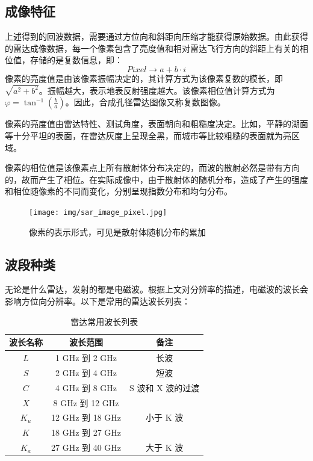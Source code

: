\documentclass{xduugthesis}
\begin{document}
\subsection{成像特征}
上述得到的回波数据，需要通过方位向和斜距向压缩才能获得原始数据。由此获得的雷达成像数据，每一个像素包含了亮度值和相对雷达飞行方向的斜距上有关的相位值，存储的是复数信息\cite{SAR_Pixel}，即：
$$Pixel\rightarrow a+b \cdot i$$
像素的亮度值是由该像素振幅决定的，其计算方式为该像素复数的模长，即$\sqrt{a^2+b^2}$。振幅越大，表示地表反射强度越大。该像素相位值计算方式为$\varphi = \tan^{-1}(\frac{b}{a})$。因此，合成孔径雷达图像又称复数图像。\par
像素的亮度值由雷达特性、测试角度，表面朝向和粗糙度决定。比如，平静的湖面等十分平坦的表面，在雷达灰度上呈现全黑，而城市等比较粗糙的表面就为亮区域。\par
像素的相位值是该像素点上所有散射体分布决定的，而波的散射必然是带有方向的，故而产生了相位。在实际成像中，由于散射体的随机分布，造成了产生的强度和相位随像素的不同而变化，分别呈现指数分布和均匀分布。
\begin{figure}[h!]
	\centering
	\texttt{[image: img/sar\_image\_pixel.jpg]}
	\caption{像素的表示形式，可见是散射体随机分布的累加}
\end{figure}

\subsection{波段种类}
无论是什么雷达，发射的都是电磁波。根据上文对分辨率的描述，电磁波的波长会影响方位向分辨率。以下是常用的雷达波长列表\cite{SAR_Radar_Wavelenngth}：
\begin{table}[h!]
	\begin{center}
		\caption{雷达常用波长列表}
		\begin{tabular}{|c|c|c|}
			\hline
			\textbf{波长名称} & \textbf{波长范围} & \textbf{备注}\\
			\hline
			$L$ & 1 GHz 到 2 GHz & 长波 \\
			\hline
			$S$ & 2 GHz 到 4 GHz & 短波 \\
			\hline
			$C$ & 4 GHz 到 8 GHz & S 波和 X 波的过渡 \\
			\hline
			$X$ & 8 GHz 到 12 GHz &  \\
			\hline
			$K_u$ & 12 GHz 到 18 GHz & 小于 K 波 \\
			\hline
			$K$ & 18 GHz 到 27 GHz &  \\
			\hline
			$K_a$ & 27 GHz 到 40 GHz & 大于 K 波 \\
			\hline
		\end{tabular}
	\end{center}
\end{table}
\end{document}
